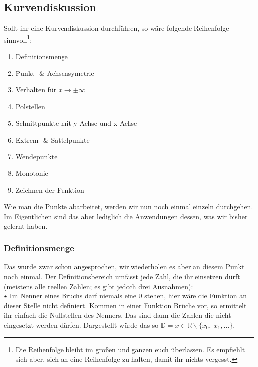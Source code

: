 \subsection{Kurvendiskussion}
	Sollt ihr eine Kurvendiskussion durchführen, so wäre folgende Reihenfolge
	sinnvoll\footnote{Die Reihenfolge bleibt im großen und ganzen euch überlassen.
	Es empfiehlt sich aber, sich an eine Reihenfolge zu halten, damit ihr nichts
	vergesst.}:\\
	\begin{enumerate}
	  \item Definitionsmenge
	  \item Punkt- \& Achsensymetrie
	  \item Verhalten für \(x \rightarrow \pm \infty\)
	  \item Polstellen
	  \item Schnittpunkte mit y-Achse und x-Achse
	  \item Extrem- \& Sattelpunkte
	  \item Wendepunkte
	  \item Monotonie
	  \item Zeichnen der Funktion
	\end{enumerate}
	Wie man die Punkte abarbeitet, werden wir nun noch einmal einzeln durchgehen.
	Im Eigentlichen sind das aber lediglich die Anwendungen dessen, was wir bisher
	gelernt haben.

	\subsubsection{Definitionsmenge}
		Das wurde zwar schon angesprochen, wir wiederholen es aber an diesem Punkt
		noch einmal. Der Definitionsbereich umfasst jede Zahl, die ihr einsetzen dürft
		(meistens alle reellen Zahlen; es gibt jedoch drei Ausnahmen):\\

		\(\star\) Im Nenner eines \underline{Bruchs} darf niemals eine 0 stehen, hier
		wäre die Funktion an dieser Stelle nicht definiert. Kommen in einer Funktion
		Brüche vor, so ermittelt ihr einfach die Nullstellen des Nenners. Das sind
		dann die Zahlen die nicht eingesetzt werden dürfen. Dargestellt würde das so
		\(\mathbb D = x \in \mathbb R \backslash\{x_0,\ x_1, \ldots \}\).\\

